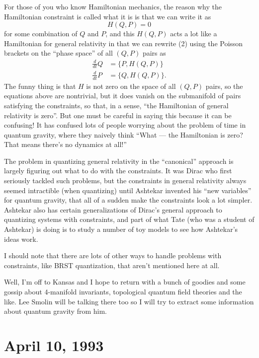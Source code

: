 \documentclass[12pt]{article}
\begin{document}
For those of you who know Hamiltonian mechanics, the reason why the
Hamiltonian constraint is called what it is is that we can write it as
\[H(Q,P) = 0\] for some combination of \(Q\) and \(P\), and this
\(H(Q,P)\) acts a lot like a Hamiltonian for general relativity in that
we can rewrite (2) using the Poisson brackets on the ``phase space'' of
all \((Q,P)\) pairs as
\[\begin{aligned}\frac{d}{dt}Q &= \{P,H(Q,P)\} \\ \frac{d}{dt}P &= \{Q,H(Q,P)\}.\end{aligned}\]
The funny thing is that \(H\) is not zero on the space of all \((Q,P)\)
pairs, so the equations above are nontrivial, but it does vanish on the
submanifold of pairs satisfying the constraints, so that, in a sense,
``the Hamiltonian of general relativity is zero''. But one must be
careful in saying this because it can be confusing! It has confused lots
of people worrying about the problem of time in quantum gravity, where
they naively think ``What --- the Hamiltonian is zero? That means
there's no dynamics at all!''

The problem in quantizing general relativity in the ``canonical''
approach is largely figuring out what to do with the constraints. It was
Dirac who first seriously tackled such problems, but the constraints in
general relativity always seemed intractible (when quantizing) until
Ashtekar invented his ``new variables'' for quantum gravity, that all of
a sudden make the constraints look a lot simpler. Ashtekar also has
certain generalizations of Dirac's general approach to quantizing
systems with constraints, and part of what Tate (who was a student of
Ashtekar) is doing is to study a number of toy models to see how
Ashtekar's ideas work.

I should note that there are lots of other ways to handle problems with
constraints, like BRST quantization, that aren't mentioned here at all.

Well, I'm off to Kansas and I hope to return with a bunch of goodies and
some gossip about 4-manifold invariants, topological quantum field
theories and the like. Lee Smolin will be talking there too so I will
try to extract some information about quantum gravity from him.



\hypertarget{week12}{%
\section{April 10, 1993}\label{week12}}
\end{document}
